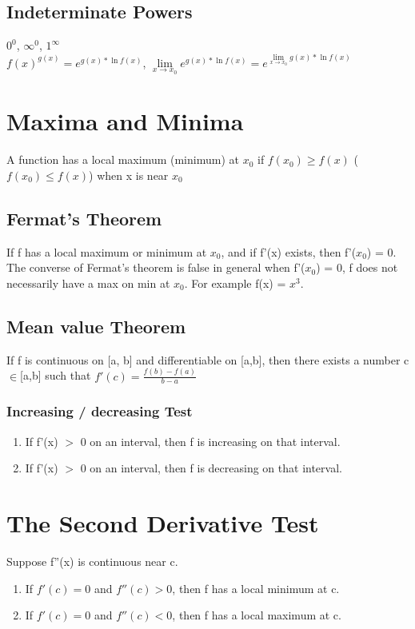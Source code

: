 \documentclass{article}
\begin{document}
 
 
\subsection{Indeterminate Powers}
$0^0$, $\infty^0$, $1^\infty$ \\
$f(x)^{g(x)} = e^{g(x)*\ln f(x)}$, $\lim\limits_{x\to x_0} e^{g(x)*\ln f(x)} = e^{\lim\limits_{x\to x_0}g(x)*\ln f(x)}$

\section{Maxima and Minima}
A function has a local maximum (minimum) at $x_0$ if $f(x_0) \geq f(x)$ ($f(x_0) \leq f(x)$) when x is near $x_0$
 
 
 
\subsection{Fermat's Theorem}
If f has a local maximum or minimum at $x_0$, and if f'(x) exists, then f'($x_0$) = 0.\\
The converse of Fermat's theorem is false in general when f'($x_0$) = 0, f does not necessarily have a max on min at $x_0$. For example f(x) = $x^3$.
 
 
 \subsection{Mean value Theorem}
If f is continuous on [a, b] and differentiable on [a,b], then there exists a number c $\in$[a,b] such that $f'(c) = \frac{f(b) - f(a)}{b-a}$
\subsubsection{Increasing / decreasing Test}
\begin{enumerate}
	\item If f'(x) $>$ 0 on an interval, then f is increasing on that interval. 
	\item If f'(x) $>$ 0 on an interval, then f is decreasing on that interval.
\end{enumerate}
 
\section{The Second Derivative Test}
Suppose f''(x) is continuous near c.
\begin{enumerate}
	\item If $f'(c) = 0$ and $f''(c) > 0$, then f has a local minimum at c.
	\item If $f'(c) = 0$ and $f''(c) < 0$, then f has a local maximum at c.
\end{enumerate}
 
\end{document}
